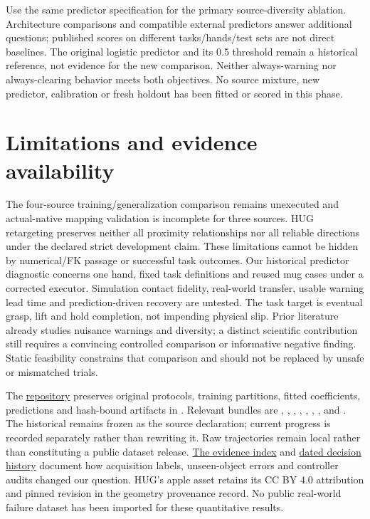 \documentclass[10pt,letterpaper]{article}
\newcommand{\projecturl}{https://github.com/nilakarthikesan/grasp-failure-recovery}
\begin{document}
Use the same predictor specification for the primary source-diversity ablation.
Architecture comparisons and compatible external predictors answer additional
questions; published scores on different tasks/hands/test sets are not direct
baselines. The original logistic predictor and its 0.5 threshold remain a
historical reference, not evidence for the new comparison. Neither always-warning
nor always-clearing behavior meets both objectives. No source mixture, new
predictor, calibration or fresh holdout has been fitted or scored in this phase.

\section{Limitations and evidence availability}
The four-source training/generalization comparison remains unexecuted and
actual-native mapping validation is incomplete for three sources. HUG
retargeting preserves neither all proximity relationships nor all reliable
directions under the declared strict development claim. These limitations
cannot be hidden by numerical/FK passage or successful task outcomes.
Our historical predictor diagnostic concerns one hand, fixed task definitions and reused
mug cases under a corrected executor. Simulation contact fidelity, real-world
transfer, usable warning lead time and prediction-driven recovery are untested.
The task target is eventual grasp, lift and hold completion, not impending
physical slip. Prior literature already studies nuisance warnings and diversity;
a distinct scientific contribution still requires a convincing controlled
comparison or informative negative finding. Static feasibility constrains that
comparison and should not be replaced by unsafe or mismatched trials.

The \href{\projecturl}{repository} preserves original protocols, training
partitions, fitted coefficients, predictions and hash-bound artifacts in
. Relevant bundles are
, ,
, ,
, ,
,  and
.
The historical  remains frozen as the source
declaration; current progress is recorded separately rather than rewriting it.
Raw trajectories remain local rather than constituting a public dataset release.
\href{../PAPER_PROGRESS.md}{The evidence index} and
\href{../RESEARCH_DECISIONS.md}{dated decision history} document how acquisition
labels, unseen-object errors and controller audits changed our question.
HUG's apple asset retains its CC BY 4.0 attribution and pinned revision in the
geometry provenance record. No public real-world failure dataset has been
imported for these quantitative results.
\end{document}
